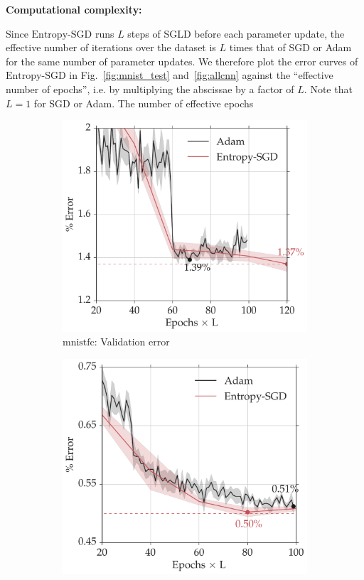 \documentclass[10pt]{article}
\newcommand{\entropysgd}{\mathrm{Entropy}\textrm{-}\mathrm{SGD}}
\newcommand{\mnistfc}{\textrm{mnistfc}}
\newcommand{\pc}[2]{{\color{ForestGreen}#1}\marginpar{\tiny\noindent{\raggedright{\color{Sienna}[PC]}\color{Sienna}{#2} \par}}}
\begin{document}
\textbf{Computational complexity:} \pc{Since $\entropysgd$ runs $L$ steps of SGLD before each parameter update, the effective number of iterations over the dataset is $L$ times that of SGD or Adam for the same number of parameter updates. We therefore plot the error curves of $\entropysgd$ in Fig.~\ref{fig:mnist_test} and~\ref{fig:allcnn} against the ``effective number of epochs'', i.e. by multiplying the abscissae by a factor of $L$. Note that $L = 1$ for SGD or Adam. The number of effective epochs 

}{add wall-clock times}

\begin{figure}[htp!]
\centering
    \begin{subfigure}[t]{0.4\textwidth}
        \centering
        \includegraphics[width=1.02\textwidth]{mnistfc_valid.pdf}
        \caption{\small $\mnistfc$: Validation error}
        \label{fig:mnistfc_test}
    \end{subfigure}
    \hspace{0.2in}
    \begin{subfigure}[t]{0.4\textwidth}
        \centering
        \includegraphics[width=\textwidth]{lenet_valid.pdf}

\end{subfigure}
\end{figure}
\end{document}
